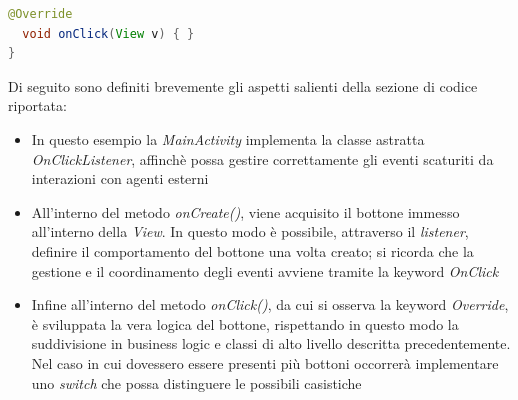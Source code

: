 \documentclass{article}
\begin{document}
\begin{enumerate}
\begin{lstlisting}[language=JAVA, title=Gestione evento tramite Event Listener]
  @Override 
  void onClick(View v) { }
}
  \end{lstlisting}
  Di seguito sono definiti brevemente gli aspetti salienti della sezione di codice riportata:
  \begin{itemize}
    \itemsep0em
    \item In questo esempio la \textit{MainActivity} implementa la classe astratta \textit{OnClickListener}, affinchè possa gestire correttamente gli eventi scaturiti da interazioni con agenti esterni
    \item All'interno del metodo \textit{onCreate()}, viene acquisito il bottone immesso all'interno della \textit{View}. In questo modo è possibile, attraverso il \textit{listener}, definire il comportamento del bottone una volta creato; si ricorda che la gestione e il coordinamento degli eventi avviene tramite la keyword \textit{OnClick}
    \item Infine all'interno del metodo \textit{onClick()}, da cui si osserva la keyword \textit{Override}, è sviluppata la vera logica del bottone, rispettando in questo modo la suddivisione in business logic e classi di alto livello descritta precedentemente. Nel caso in cui dovessero essere presenti più bottoni occorrerà implementare uno \textit{switch} che possa distinguere le possibili casistiche
  \end{itemize}
\end{enumerate}
\end{document}
